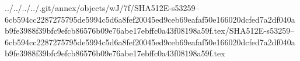 ../../../../.git/annex/objects/wJ/7f/SHA512E-s53259--6cb594cc2287275795de5994c5d6a8fef20045ed9ceb69eafaf50e166020dcfed7a2df040ab9fe3988f39bfc9efcb86576b09e76abe17ebffc0a43f08198a59f.tex/SHA512E-s53259--6cb594cc2287275795de5994c5d6a8fef20045ed9ceb69eafaf50e166020dcfed7a2df040ab9fe3988f39bfc9efcb86576b09e76abe17ebffc0a43f08198a59f.tex